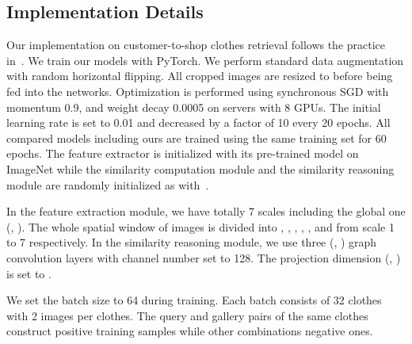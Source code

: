 \documentclass[10pt,twocolumn,letterpaper]{article}
\begin{document}
\subsection{Implementation Details}
Our implementation on customer-to-shop clothes retrieval follows the practice in~\cite{Liu2016}. We train our models with PyTorch.
We perform standard data augmentation with random horizontal flipping. All cropped images are resized to
 before being fed into the networks. Optimization is performed using synchronous SGD with momentum 0.9, and weight decay 0.0005 on servers with 8 GPUs. The initial learning rate is set to 0.01 and decreased by a factor of 10 every 20 epochs. All compared models including ours are trained using the same training set for 60 epochs. The feature extractor is initialized with its pre-trained model on ImageNet
while the similarity computation module and the similarity reasoning module are randomly initialized as with~\cite{He2015b}.

  In the feature extraction module, we have totally 7 scales including the global one (\ie, ). The whole spatial window of images is divided into , , , , ,  and  from scale 1 to 7 respectively. In the similarity reasoning module, we use three (\ie, ) graph convolution layers with channel number  set to 128. The projection dimension (\ie, ) is set to .

We set the batch size to 64 during training. Each batch consists of 32 clothes with 2 images per clothes. The query and gallery pairs of the same clothes construct positive training samples while other combinations negative ones.
\end{document}
